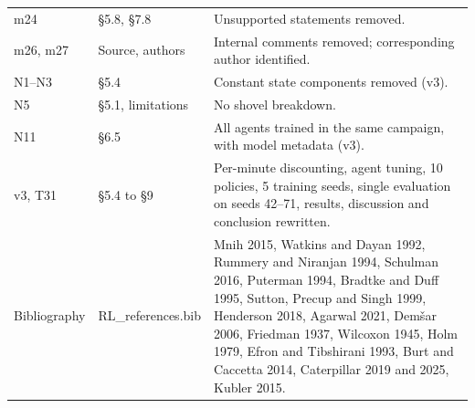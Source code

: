 \documentclass[11pt,a4paper]{article}
\begin{document}
\begin{longtable}{p{2.2cm}p{4.3cm}p{8.6cm}}
m24 & §5.8, §7.8 & Unsupported statements removed. \\
m26, m27 & Source, authors & Internal comments removed; corresponding author identified. \\
N1--N3 & §5.4 & Constant state components removed (v3). \\
N5 & §5.1, limitations & No shovel breakdown. \\
N11 & §6.5 & All agents trained in the same campaign, with model metadata (v3). \\
v3, T31 & §5.4 to §9 & Per-minute discounting, agent tuning, 10 policies, 5 training seeds, single evaluation on seeds 42--71, results, discussion and conclusion rewritten. \\
Bibliography & RL\_references.bib & Mnih 2015, Watkins and Dayan 1992, Rummery and Niranjan 1994, Schulman 2016, Puterman 1994, Bradtke and Duff 1995, Sutton, Precup and Singh 1999, Henderson 2018, Agarwal 2021, Dem\v{s}ar 2006, Friedman 1937, Wilcoxon 1945, Holm 1979, Efron and Tibshirani 1993, Burt and Caccetta 2014, Caterpillar 2019 and 2025, Kubler 2015. \\
\bottomrule
\end{longtable}
\normalsize
\fi
\end{document}
